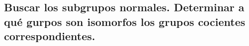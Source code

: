 \subsection{Buscar los subgrupos normales. Determinar a qué gurpos son isomorfos los grupos cocientes correspondientes.}
